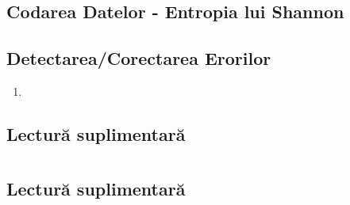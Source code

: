 \documentclass[a4paper,10pt]{article}
\begin{document}
\subsection{Codarea Datelor - Entropia lui Shannon}

\subsection{Detectarea/Corectarea Erorilor}
\begin{enumerate}
    \item 
\end{enumerate}

\subsection{Lectură suplimentară}


\section{}
\subsection{}

\subsection{}

\subsection{}

\subsection{Lectură suplimentară}


\section{}
\subsection{}

\subsection{}

\subsection{}
\end{document}
